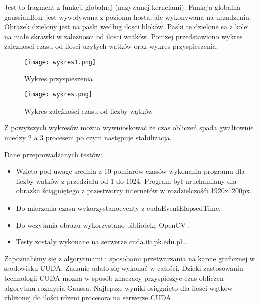\documentclass[a4paper,12pt]{article}
\newenvironment{lista}{
\begin{itemize}
  \setlength{\itemsep}{1pt}
  \setlength{\parskip}{0pt}
  \setlength{\parsep}{0pt}
}{\end{itemize}}
\begin{document}
Jest to fragment z funkcji globalnej (nazywanej kernelami). Funkcja globalna gaussianBlur jest wywoływana z poziomu hosta, ale wykonywana na urzadzeniu. Obrazek dzielony jest na paski według ilosci bloków. Paski te dzielone sa z kolei na małe skrawki w zaleznosci od ilosci watków. Ponizej przedstawiono wykres zaleznosci czasu od ilosci uzytych watków oraz wykres przyspieszenia:

\begin{figure}[!hbp]
	\centering
  \texttt{[image: wykres1.png]}
  \caption{Wykres przyspieszenia}
\end{figure}


\begin{wrapfigure}{r}{0.5\textwidth}
  \vspace{-20pt}
  \begin{center}
  \texttt{[image: wykres.png]}
  \end{center}
  \vspace{-20pt}
  \caption{Wykres zależności czasu od liczby wątków}
  \vspace{-10pt}
\end{wrapfigure}

Z powyższych wykresów można wywnioskować że czas obliczeń spada gwałtownie miedzy 2 a 3 procesem po czym następuje stabilizacja.

Dane przeprowadzanych testów:
\begin{lista}
 \item Wzieto pod uwage srednia z 10 pomiarów czasów wykonania programu dla liczby
watków z przedziału od 1 do 1024. Program był uruchamiany dla obrazka ściągniętego z przestworzy internetów w rozdzielczośći 1920x1200px.
 \item Do mierzenia czasu wykorzystanoeventy z cudaEventElapsedTime.
 \item Do wczytania obrazu wykorzystano bibliotekę OpenCV .
 \item Testy zostały wykonane na serwerze cuda.iti.pk.edu.pl . 
\end{lista}
 
Zapoznaliśmy się z algorytmami i sposobami przetwarzania na karcie graficznej w
srodowisku CUDA. Zadanie udało się wykonać w całości. Dzieki zastosowaniu technologii CUDA mozna w sposób znaczacy przyspieszyc czas obliczen algorytmu rozmycia Gaussa. Najlepsze wyniki osiągnięto dla ilości wątków zbliżonej do ilości rdzeni procesora na serwerze CUDA. 
\end{document}
